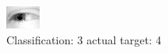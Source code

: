 \begin{figure}[h!]
\begin{center}
\includegraphics[width=0.60\columnwidth]{figures/ID2480_class_3_target_4.png}
\end{center}
\caption{ Classification: 3 actual target: 4}
\label{fig:ID2480_class_3_target_4}
\end{figure}

